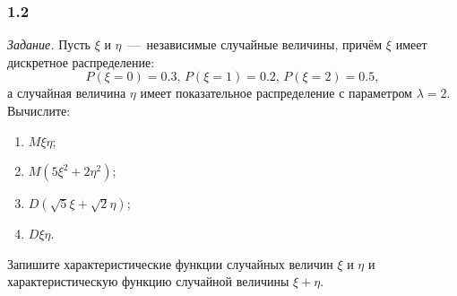 \subsubsection*{1.2}

\textit{Задание.}
Пусть $ \xi $ и $ \eta $~---~независимые случайные величины,
причём $ \xi $ имеет дискретное распределение:
\begin{equation*}
  P \left( \xi = 0 \right) = 0.3, \,
  P \left( \xi = 1 \right) = 0.2, \,
  P \left( \xi = 2 \right) = 0.5,
\end{equation*}
а случайная величина $ \eta $ имеет показательное распределение с параметром
$ \lambda =
 2$.
Вычислите:
\begin{enumerate}[label=\alph*)]
  \item $M \xi \eta $;
  \item $M \left( 5 \xi^2 + 2 \eta^2 \right) $;
  \item $D \left( \sqrt{5} \xi + \sqrt{2} \eta \right) $;
  \item $D \xi \eta $.
\end{enumerate}
Запишите характеристические функции случайных величин $ \xi $ и $ \eta $
и характеристическую функцию случайной величины $ \xi + \eta $.

